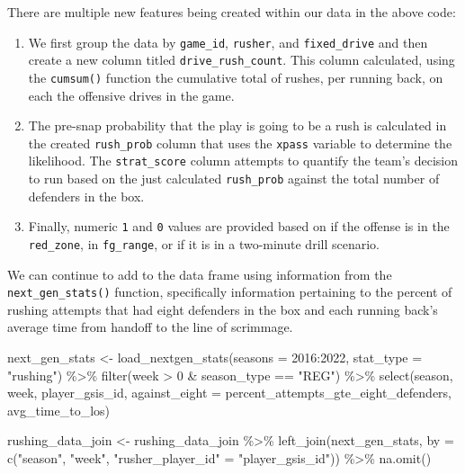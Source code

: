 \documentclass[
  letterpaper,
]{krantz}
\newenvironment{Shaded}{\begin{snugshade}}{\end{snugshade}}
\newcommand{\AttributeTok}[1]{\textcolor[rgb]{0.40,0.45,0.13}{#1}}
\newcommand{\DecValTok}[1]{\textcolor[rgb]{0.68,0.00,0.00}{#1}}
\newcommand{\FunctionTok}[1]{\textcolor[rgb]{0.28,0.35,0.67}{#1}}
\newcommand{\NormalTok}[1]{\textcolor[rgb]{0.00,0.23,0.31}{#1}}
\newcommand{\OtherTok}[1]{\textcolor[rgb]{0.00,0.23,0.31}{#1}}
\newcommand{\SpecialCharTok}[1]{\textcolor[rgb]{0.37,0.37,0.37}{#1}}
\newcommand{\StringTok}[1]{\textcolor[rgb]{0.13,0.47,0.30}{#1}}
\providecommand{\tightlist}{%
  \setlength{\itemsep}{0pt}\setlength{\parskip}{0pt}}\usepackage{longtable,booktabs,array}
\begin{document}
There are multiple new features being created within our data in the
above code:

\begin{enumerate}
\def\labelenumi{\arabic{enumi}.}
\tightlist
\item
  We first group the data by \texttt{game\_id}, \texttt{rusher}, and
  \texttt{fixed\_drive} and then create a new column titled
  \texttt{drive\_rush\_count}. This column calculated, using the
  \texttt{cumsum()} function the cumulative total of rushes, per running
  back, on each the offensive drives in the game.
\item
  The pre-snap probability that the play is going to be a rush is
  calculated in the created \texttt{rush\_prob} column that uses the
  \texttt{xpass} variable to determine the likelihood. The
  \texttt{strat\_score} column attempts to quantify the team's decision
  to run based on the just calculated \texttt{rush\_prob} against the
  total number of defenders in the box.
\item
  Finally, numeric \texttt{1} and \texttt{0} values are provided based
  on if the offense is in the \texttt{red\_zone}, in \texttt{fg\_range},
  or if it is in a two-minute drill scenario.
\end{enumerate}

We can continue to add to the data frame using information from the
\texttt{next\_gen\_stats()} function, specifically information
pertaining to the percent of rushing attempts that had eight defenders
in the box and each running back's average time from handoff to the line
of scrimmage.

\begin{Shaded}
\begin{Highlighting}[]
\NormalTok{next\_gen\_stats }\OtherTok{\textless{}{-}} \FunctionTok{load\_nextgen\_stats}\NormalTok{(}\AttributeTok{seasons =} \DecValTok{2016}\SpecialCharTok{:}\DecValTok{2022}\NormalTok{,}
                                     \AttributeTok{stat\_type =} \StringTok{"rushing"}\NormalTok{) }\SpecialCharTok{\%\textgreater{}\%}
  \FunctionTok{filter}\NormalTok{(week }\SpecialCharTok{\textgreater{}} \DecValTok{0} \SpecialCharTok{\&}\NormalTok{ season\_type }\SpecialCharTok{==} \StringTok{"REG"}\NormalTok{) }\SpecialCharTok{\%\textgreater{}\%}
  \FunctionTok{select}\NormalTok{(season, week, player\_gsis\_id,}
         \AttributeTok{against\_eight =}\NormalTok{ percent\_attempts\_gte\_eight\_defenders,}
\NormalTok{         avg\_time\_to\_los)}

\NormalTok{rushing\_data\_join }\OtherTok{\textless{}{-}}\NormalTok{ rushing\_data\_join }\SpecialCharTok{\%\textgreater{}\%}
  \FunctionTok{left\_join}\NormalTok{(next\_gen\_stats,}
            \AttributeTok{by =} \FunctionTok{c}\NormalTok{(}\StringTok{"season"}\NormalTok{, }\StringTok{"week"}\NormalTok{,}
                   \StringTok{"rusher\_player\_id"} \OtherTok{=} \StringTok{"player\_gsis\_id"}\NormalTok{)) }\SpecialCharTok{\%\textgreater{}\%}
  \FunctionTok{na.omit}\NormalTok{()}
\end{Highlighting}
\end{Shaded}
\end{document}
